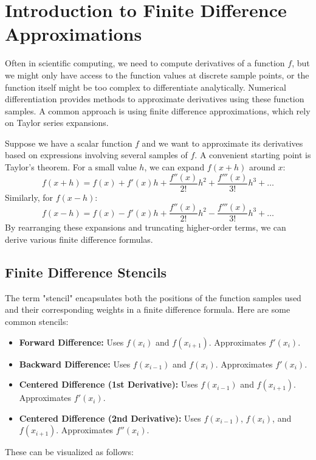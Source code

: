 \documentclass{article}
\begin{document}
\sloppy

\section{Introduction to Finite Difference Approximations}

Often in scientific computing, we need to compute derivatives of a function $f$, but we might only have access to the function values at discrete sample points, or the function itself might be too complex to differentiate analytically. Numerical differentiation provides methods to approximate derivatives using these function samples. A common approach is using finite difference approximations, which rely on Taylor series expansions.

Suppose we have a scalar function $f$ and we want to approximate its derivatives based on expressions involving several samples of $f$. A convenient starting point is Taylor's theorem. For a small value $h$, we can expand $f(x+h)$ around $x$:
\[
f(x+h) = f(x) + f'(x)h + \frac{f''(x)}{2!}h^2 + \frac{f'''(x)}{3!}h^3 + \dots
\]
Similarly, for $f(x-h)$:
\[
f(x-h) = f(x) - f'(x)h + \frac{f''(x)}{2!}h^2 - \frac{f'''(x)}{3!}h^3 + \dots
\]
By rearranging these expansions and truncating higher-order terms, we can derive various finite difference formulas.

\subsection{Finite Difference Stencils}

The term "stencil" encapsulates both the positions of the function samples used and their corresponding weights in a finite difference formula. Here are some common stencils:

\begin{itemize}
    \item \textbf{Forward Difference:} Uses $f(x_i)$ and $f(x_{i+1})$. Approximates $f'(x_i)$.
    \item \textbf{Backward Difference:} Uses $f(x_{i-1})$ and $f(x_i)$. Approximates $f'(x_i)$.
    \item \textbf{Centered Difference (1st Derivative):} Uses $f(x_{i-1})$ and $f(x_{i+1})$. Approximates $f'(x_i)$.
    \item \textbf{Centered Difference (2nd Derivative):} Uses $f(x_{i-1})$, $f(x_i)$, and $f(x_{i+1})$. Approximates $f''(x_i)$.
\end{itemize}

These can be visualized as follows:
\end{document}
